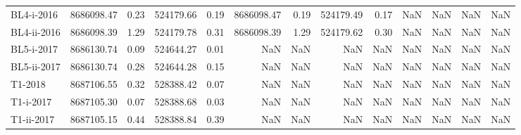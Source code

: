 \begin{tabular}{lrrrrrrrrrrrr}
  BL4-i-2016 &                8686098.47 &                            0.23 &                524179.66 &                           0.19 &                8686098.47 &                            0.19 &                524179.49 &                           0.17 &                       NaN &                             NaN &                      NaN &                            NaN \\
 BL4-ii-2016 &                8686098.39 &                            1.29 &                524179.78 &                           0.31 &                8686098.39 &                            1.29 &                524179.62 &                           0.30 &                       NaN &                             NaN &                      NaN &                            NaN \\
  BL5-i-2017 &                8686130.74 &                            0.09 &                524644.27 &                           0.01 &                       NaN &                             NaN &                      NaN &                            NaN &                       NaN &                             NaN &                      NaN &                            NaN \\
 BL5-ii-2017 &                8686130.74 &                            0.28 &                524644.28 &                           0.15 &                       NaN &                             NaN &                      NaN &                            NaN &                       NaN &                             NaN &                      NaN &                            NaN \\
     T1-2018 &                8687106.55 &                            0.32 &                528388.42 &                           0.07 &                       NaN &                             NaN &                      NaN &                            NaN &                       NaN &                             NaN &                      NaN &                            NaN \\
   T1-i-2017 &                8687105.30 &                            0.07 &                528388.68 &                           0.03 &                       NaN &                             NaN &                      NaN &                            NaN &                       NaN &                             NaN &                      NaN &                            NaN \\
  T1-ii-2017 &                8687105.15 &                            0.44 &                528388.84 &                           0.39 &                       NaN &                             NaN &                      NaN &                            NaN &                       NaN &                             NaN &                      NaN &                            NaN \\

\end{tabular}
